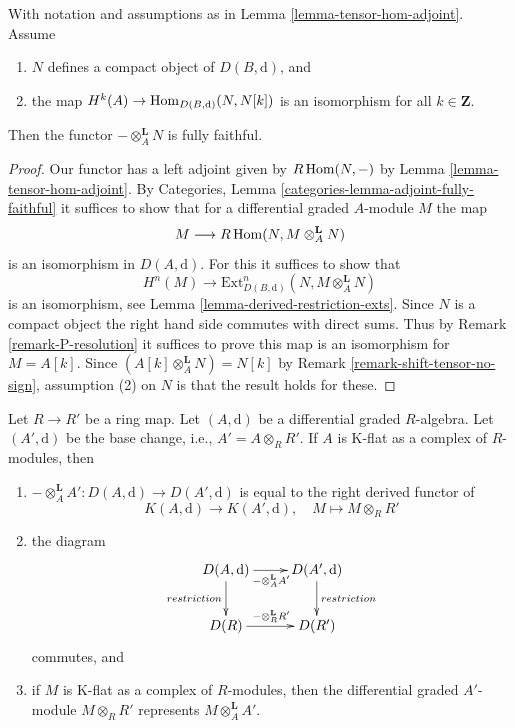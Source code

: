 \begin{lemma}
\label{lemma-tensor-with-compact-fully-faithful}
With notation and assumptions as in Lemma \ref{lemma-tensor-hom-adjoint}.
Assume
\begin{enumerate}
\item $N$ defines a compact object of $D(B, \text{d})$, and
\item the map $H^k(A) \to \mathop{\mathrm{Hom}}\nolimits_{D(B, \text{d})}(N, N[k])$ is an
isomorphism for all $k \in \mathbf{Z}$.
\end{enumerate}
Then the functor $-\otimes_A^\mathbf{L} N$ is fully faithful.
\end{lemma}

\begin{proof}
Our functor has a left adjoint given by
$R\mathop{\mathrm{Hom}}\nolimits(N, -)$ by Lemma \ref{lemma-tensor-hom-adjoint}.
By Categories, Lemma \ref{categories-lemma-adjoint-fully-faithful}
it suffices to show that for a differential graded $A$-module $M$
the map
$$
M \longrightarrow R\mathop{\mathrm{Hom}}\nolimits(N, M \otimes_A^\mathbf{L} N)
$$
is an isomorphism in $D(A, \text{d})$. For this it suffices to show that
$$
H^n(M) \longrightarrow
\text{Ext}^n_{D(B, \text{d})}(N, M \otimes_A^\mathbf{L} N)
$$
is an isomorphism, see Lemma \ref{lemma-derived-restriction-exts}.
Since $N$ is a compact object the right hand side commutes
with direct sums. Thus by Remark \ref{remark-P-resolution}
it suffices to prove this map is an isomorphism for $M = A[k]$.
Since $(A[k] \otimes_A^\mathbf{L} N) = N[k]$ by
Remark \ref{remark-shift-tensor-no-sign},
assumption (2) on $N$ is that the result holds for these.
\end{proof}

\begin{lemma}
\label{lemma-base-change-K-flat}
Let $R \to R'$ be a ring map. Let $(A, \text{d})$ be a differential
graded $R$-algebra. Let $(A', \text{d})$ be the base change, i.e.,
$A' = A \otimes_R R'$. If $A$ is K-flat as a complex of $R$-modules,
then
\begin{enumerate}
\item $- \otimes_A^\mathbf{L} A' : D(A, \text{d}) \to D(A', \text{d})$
is equal to the right derived functor of
$$
K(A, \text{d}) \longrightarrow K(A', \text{d}),\quad
M \longmapsto M \otimes_R R'
$$
\item the diagram
$$
\xymatrix{
D(A, \text{d}) \ar[r]_{- \otimes_A^\mathbf{L} A'} \ar[d]_{restriction} &
D(A', \text{d}) \ar[d]^{restriction} \\
D(R) \ar[r]^{- \otimes_R^\mathbf{L} R'} & D(R')
}
$$
commutes, and
\item if $M$ is K-flat as a complex of $R$-modules, then the
differential graded $A'$-module $M \otimes_R R'$ represents
$M \otimes_A^\mathbf{L} A'$.
\end{enumerate}
\end{lemma}

